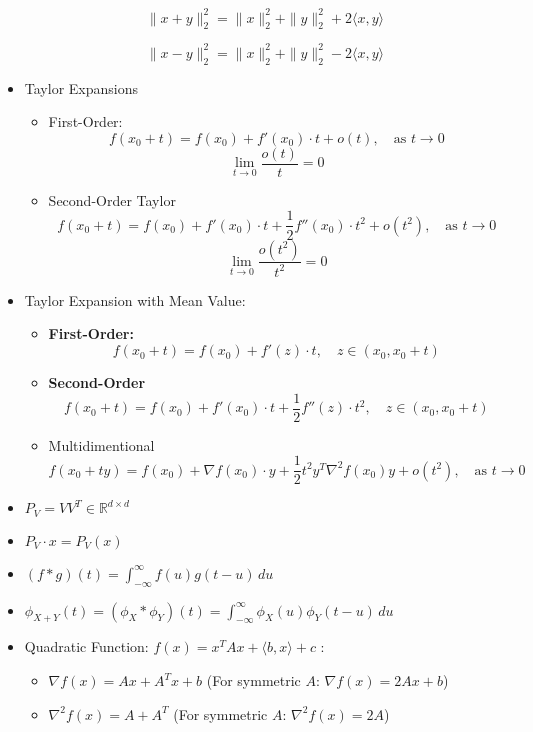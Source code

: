 \documentclass{article}
\begin{document}
\begin{itemize}
\[ \|x + y\|_2^2 = \|x\|_2^2 + \|y\|_2^2 + 2 \langle x, y \rangle \]

\[ \|x - y\|_2^2 = \|x\|_2^2 + \|y\|_2^2 - 2 \langle x, y \rangle \]


\item Taylor Expansions
\begin{itemize}

\item First-Order:
\[
f(x_0 + t) = f(x_0) + f'(x_0) \cdot t + o(t), \quad \text{as } t \to 0
\]
\[
\lim_{t \to 0} \frac{o(t)}{t} = 0
\]

\item Second-Order Taylor
   \[
        f(x_0 + t) = f(x_0) + f'(x_0) \cdot t + \frac{1}{2} f''(x_0) \cdot t^2 + o(t^2), \quad \text{as } t \to 0
        \]
    \[
        \lim_{t \to 0} \frac{o(t^2)}{t^2} = 0
        \]
\end{itemize}

\item Taylor Expansion with Mean Value:
\begin{itemize}
    \item \textbf{First-Order:}
    \[
    f(x_0 + t) = f(x_0) + f'(z) \cdot t, \quad z \in (x_0, x_0 + t)
    \]

    \item \textbf{Second-Order }
    \[
    f(x_0 + t) = f(x_0) + f'(x_0) \cdot t + \frac{1}{2} f''(z) \cdot t^2, \quad z \in (x_0, x_0 + t)
    \]

    \item Multidimentional 
    \[
f(x_0 + ty) = f(x_0) + \nabla f(x_0) \cdot y + \frac{1}{2} t^2 y^T \nabla^2 f(x_0) y + o(t^2), \quad \text{as } t \to 0
\]
\end{itemize}

\item  $
    P_V = V V^T \in \mathbb{R}^{d \times d}
    $
\item   $
    P_V \cdot x = P_V(x)
    $
\item $
(f * g)(t) = \int_{-\infty}^{\infty} f(u)g(t - u) \, du
$

\item $
\phi_{X+Y}(t) = \left( \phi_X * \phi_Y \right)(t) = \int_{-\infty}^{\infty} \phi_X(u)\phi_Y(t - u) \, du
$



\item Quadratic Function: $
f(x) = x^T A x + \langle b, x \rangle + c
$ :

\begin{itemize}
    \item $
\nabla f(x) = Ax + A^T x + b
$
(For symmetric \(A\): \(\nabla f(x) = 2Ax + b\))
\item $
\nabla^2 f(x) = A + A^T
$
(For symmetric \(A\): \(\nabla^2 f(x) = 2A\))


\end{itemize}
\end{itemize}
\end{document}
